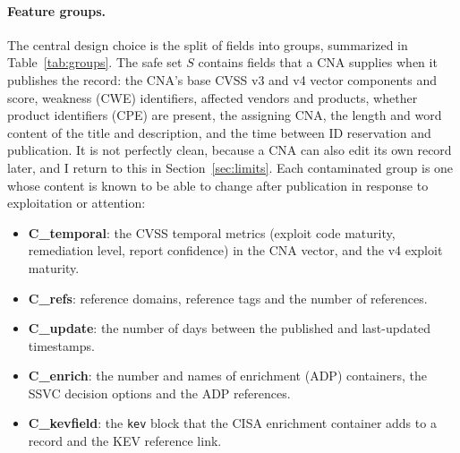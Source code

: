 \documentclass[11pt,a4paper]{article}
\begin{document}
\paragraph{Feature groups.} The central design choice is the split of fields into groups, summarized in Table~\ref{tab:groups}. The safe set $S$ contains fields that a CNA supplies when it publishes the record: the CNA's base CVSS v3 and v4 vector components and score, weakness (CWE) identifiers, affected vendors and products, whether product identifiers (CPE) are present, the assigning CNA, the length and word content of the title and description, and the time between ID reservation and publication. It is not perfectly clean, because a CNA can also edit its own record later, and I return to this in Section~\ref{sec:limits}. Each contaminated group is one whose content is known to be able to change after publication in response to exploitation or attention:
\begin{itemize}
\item \textbf{C\_temporal}: the CVSS temporal metrics (exploit code maturity, remediation level, report confidence) in the CNA vector, and the v4 exploit maturity.
\item \textbf{C\_refs}: reference domains, reference tags and the number of references.
\item \textbf{C\_update}: the number of days between the published and last-updated timestamps.
\item \textbf{C\_enrich}: the number and names of enrichment (ADP) containers, the SSVC decision options and the ADP references.
\item \textbf{C\_kevfield}: the \texttt{kev} block that the CISA enrichment container adds to a record and the KEV reference link.
\end{itemize}
\end{document}
